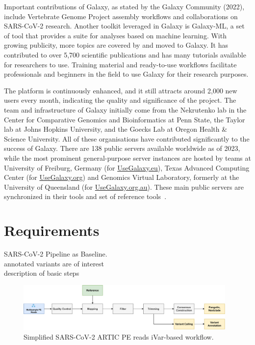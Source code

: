 Important contributions of Galaxy, as stated by the Galaxy Community (2022), include Vertebrate Genome Project assembly workflows and collaborations on SARS-CoV-2 research. Another toolkit leveraged in Galaxy is Galaxy-ML, a set of tool that provides a suite for analyses based on machine learning. With growing publicity, more topics are covered by and moved to Galaxy. It has contributed to over 5,700 scientific publications and has many tutorials available for researchers to use. Training material and ready-to-use workflows facilitate professionals and beginners in the field to use Galaxy for their research purposes.

The platform is continuously enhanced, and it still attracts around 2,000 new users every month, indicating the quality and significance of the project. The team and infrastructure of Galaxy initially come from the Nekrutenko lab in the Center for Comparative Genomics and Bioinformatics at Penn State, the Taylor lab at Johns Hopkins University, and the Goecks Lab at Oregon Health \& Science University. All of these organisations have contributed significantly to the success of Galaxy. There are 138 public servers available worldwide as of 2023, while the most prominent general-purpose server instances are hosted by teams at University of Freiburg, Germany (for \href{https://usegalaxy.eu/}{UseGalaxy.eu}), Texas Advanced Computing Center (for \href{https://usegalaxy.org/}{UseGalaxy.org}) and Genomics Virtual Laboratory, formerly at the University of Queensland (for \href{https://usegalaxy.org.au/}{UseGalaxy.org.au}). These main public servers are synchronized in their tools and set of reference tools~\cite{10.1093/nar/gkac247}.

\section{Requirements}

SARS-CoV-2 Pipeline as Baseline. \\
annotated variants are of interest \\
description of basic steps

\begin{figure}[ht!]
	\centering
	\includegraphics[width=0.97\textwidth]{media/3-pipelines-SARS-CoV-2.pdf}
	\caption{Simplified SARS-CoV-2 ARTIC PE reads iVar-based workflow.}
	\label{fig:3-pipelines-sars}
\end{figure}

